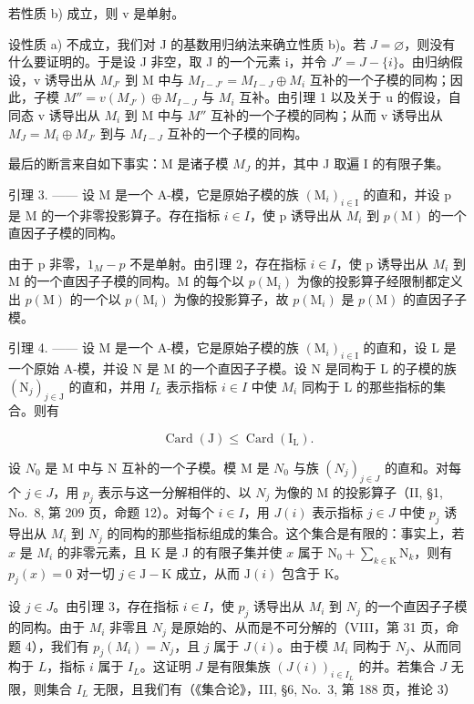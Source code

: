若性质 b) 成立，则 v 是单射。

设性质 a) 不成立，我们对 J 的基数用归纳法来确立性质 b)。若 \(J = \varnothing\)，则没有什么要证明的。于是设 J 非空，取 J 的一个元素 i，并令 \(J' = J - \{i\}\)。由归纳假设，v 诱导出从 \(M_{J'}\) 到 M 中与 \(M_{I-J'} = M_{I-J} \oplus M_i\) 互补的一个子模的同构；因此，子模 \(M'' = v(M_{J'}) \oplus M_{I-J}\) 与 \(M_i\) 互补。由引理 1 以及关于 u 的假设，自同态 v 诱导出从 \(M_i\) 到 M 中与 \(M''\) 互补的一个子模的同构；从而 v 诱导出从 \(M_J = M_i \oplus M_{J'}\) 到与 \(M_{I-J}\) 互补的一个子模的同构。

最后的断言来自如下事实：M 是诸子模 \(M_{J}\) 的并，其中 J 取遍 I 的有限子集。

引理 3. —— 设 M 是一个 A-模，它是原始子模的族 \((\mathrm{M}_{i})_{i\in\mathrm{I}}\) 的直和，并设 p 是 M 的一个非零投影算子。存在指标 \(i\in I\)，使 p 诱导出从 \(M_{i}\) 到 \(p(\mathrm{M})\) 的一个直因子子模的同构。

由于 p 非零，\(1_{M} - p\) 不是单射。由引理 2，存在指标 \(i \in I\)，使 p 诱导出从 \(M_{i}\) 到 M 的一个直因子子模的同构。M 的每个以 \(p(\mathrm{M}_{i})\) 为像的投影算子经限制都定义出 \(p(\mathrm{M})\) 的一个以 \(p(\mathrm{M}_{i})\) 为像的投影算子，故 \(p(\mathrm{M}_{i})\) 是 \(p(\mathrm{M})\) 的直因子子模。

引理 4. —— 设 M 是一个 A-模，它是原始子模的族 \((\mathrm{M}_{i})_{i\in\mathrm{I}}\) 的直和，设 L 是一个原始 A-模，并设 N 是 M 的一个直因子子模。设 N 是同构于 L 的子模的族 \((\mathrm{N}_{j})_{j\in\mathrm{J}}\) 的直和，并用 \(I_{L}\) 表示指标 \(i\in I\) 中使 \(M_{i}\) 同构于 L 的那些指标的集合。则有

\[
\operatorname{Card} (\mathrm{J}) \leqslant \operatorname{Card} \left(\mathrm{I} _ {\mathrm{L}}\right).\tag{1}
\]

设 \(N_0\) 是 M 中与 N 互补的一个子模。模 M 是 \(N_0\) 与族 \((N_j)_{j \in J}\) 的直和。对每个 \(j \in J\)，用 \(p_j\) 表示与这一分解相伴的、以 \(N_j\) 为像的 M 的投影算子（II, §1, No.~8, 第 209 页，命题 12）。对每个 \(i \in I\)，用 \(J(i)\) 表示指标 \(j \in J\) 中使 \(p_j\) 诱导出从 \(M_i\) 到 \(N_j\) 的同构的那些指标组成的集合。这个集合是有限的：事实上，若 \(x\) 是 \(M_i\) 的非零元素，且 K 是 J 的有限子集并使 \(x\) 属于 \(\mathrm{N}_0 + \sum_{k\in \mathrm{K}}\mathrm{N}_k\)，则有 \(p_j(x) = 0\) 对一切 \(j\in \mathrm{J} - \mathrm{K}\) 成立，从而 \(\mathrm{J}(i)\) 包含于 \(\mathrm{K}\)。

设 \(j \in J\)。由引理 3，存在指标 \(i \in I\)，使 \(p_j\) 诱导出从 \(M_i\) 到 \(N_j\) 的一个直因子子模的同构。由于 \(M_i\) 非零且 \(N_j\) 是原始的、从而是不可分解的（VIII，第 31 页，命题 4），我们有 \(p_j(M_i) = N_j\)，且 \(j\) 属于 \(J(i)\)。由于模 \(M_i\) 同构于 \(N_j\)、从而同构于 \(L\)，指标 \(i\) 属于 \(I_L\)。这证明 \(J\) 是有限集族 \((J(i))_{i \in I_L}\) 的并。若集合 \(J\) 无限，则集合 \(I_L\) 无限，且我们有（《集合论》，III, §6, No.~3, 第 188 页，推论 3）

